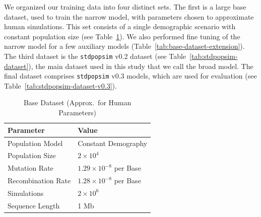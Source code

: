 \documentclass{article}
\newcommand{\stdpopsim}{\texttt{stdpopsim}\xspace}
\begin{document}
We organized our training data into four distinct sets. The first is a large base dataset,
used to train the narrow model, with parameters chosen to approximate human simulations.
This set consists of a single demographic scenario with constant population size
(see Table~\ref{tab:base-dataset}). 
We also performed fine tuning of the narrow model for a
few auxiliary models (Table~\ref{tab:base-dataset-extension}).
The third dataset is the \stdpopsim v0.2 dataset (see Table~\ref{tab:stdpopsim-dataset}), 
the main dataset used in this study that we call the broad model. 
The final dataset comprises \stdpopsim v0.3 models, which are used for evaluation (see Table~\ref{tab:stdpopsim-dataset-v0.3}).



\begin{table}[b]
    \centering
    \caption{Base Dataset (Approx.\ for Human Parameters)}
    \label{tab:base-dataset}
    \begin{tabular}{ll}
        \toprule
        \textbf{Parameter} & \textbf{Value} \\
        \midrule
        Population Model           & Constant Demography \\
        Population Size            & $2 \times 10^4$ \\
        Mutation Rate              & $1.29 \times 10^{-8}$ per Base \\
        Recombination Rate         & $1.28 \times 10^{-8}$  per Base\\
        Simulations      & $2 \times 10^6$ \\
        Sequence Length            & 1 Mb \\
        \bottomrule
    \end{tabular}
\end{table}
\end{document}
